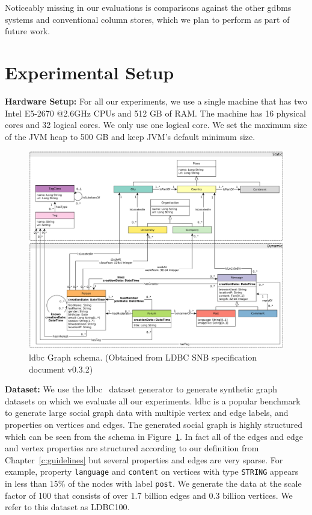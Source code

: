 Noticeably missing in our evaluations is comparisons against the other \gls{gdbms} systems and conventional column stores, which we plan to perform as part of future work.

\section{Experimental Setup}

\noindent \textbf{Hardware Setup:} For all our experiments, we use a single machine that has two Intel E5-2670 @2.6GHz CPUs and 512 GB of RAM. The machine has 16 physical cores and 32 logical cores. We only use one logical core. We set the maximum size of the JVM heap to 500 GB and keep JVM's default minimum size.

\begin{figure}
	\centering
	\includegraphics[scale=0.42]{img/ldbc-schema}
	\captionsetup{justification=centering}
	\caption{\gls{ldbc} Graph schema. (Obtained from LDBC SNB specification document v0.3.2)}
	\label{fig:ldbc-schema}
\end{figure}

\noindent \textbf{Dataset:} We use the \gls{ldbc}~\cite{ldbc} dataset generator to generate synthetic graph datasets on which we evaluate all our experiments. \gls{ldbc} is a popular benchmark to generate large social graph data with multiple vertex and edge labels, and properties on vertices and edges. The generated social graph is highly structured which can be seen from the schema in Figure~\ref{fig:ldbc-schema}. In fact all of the edges and edge and vertex properties are structured according to our definition from Chapter~\ref{c:guidelines} but several properties and edges are very sparse. For example, property \texttt{language} and \texttt{content} on vertices with type \texttt{STRING} appears in less than 15\% of the nodes with label \texttt{post}. We generate the data at the scale factor of 100 that consists of over 1.7 billion edges and 0.3 billion vertices. We refer to this dataset as LDBC100.

